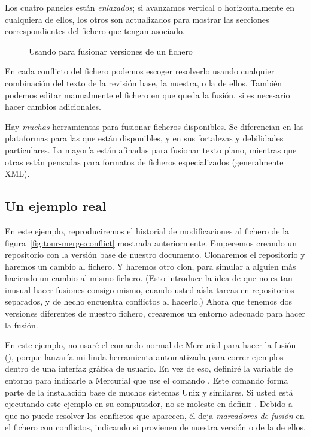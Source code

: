 Los cuatro paneles están \emph{enlazados}; si avanzamos vertical o
horizontalmente en cualquiera de ellos, los otros son actualizados
para mostrar las secciones correspondientes del fichero que tengan
asociado.

\begin{figure}[ht]
  \centering
  \caption{Usando  para fusionar versiones de un
  fichero}
  \label{fig:tour-merge:kdiff3}
\end{figure}

En cada conflicto del fichero podemos escoger resolverlo usando
cualquier combinación del texto de la revisión base, la nuestra, o la
de ellos. También podemos editar manualmente el fichero en que queda
la fusión, si es necesario hacer cambios adicionales.

Hay \emph{muchas} herramientas para fusionar ficheros disponibles. Se
diferencian en las plataformas para las que están disponibles, y en
sus fortalezas y debilidades particulares. La mayoría están afinadas
para fusionar texto plano, mientras que otras están pensadas para
formatos de ficheros especializados (generalmente XML).

\subsection{Un ejemplo real}

En este ejemplo, reproduciremos el historial de modificaciones al
fichero de la figura~\ref{fig:tour-merge:conflict} mostrada
anteriormente.  Empecemos creando un repositorio con la versión base
de nuestro documento.
Clonaremos el repositorio y haremos un cambio al fichero.
Y haremos otro clon, para simular a alguien más haciendo un cambio al
mismo fichero. (Esto introduce la idea de que no es tan inusual hacer
fusiones consigo mismo, cuando usted aísla tareas en repositorios
separados, y de hecho encuentra conflictos al hacerlo.)
Ahora que tenemos dos versiones diferentes de nuestro fichero,
crearemos un entorno adecuado para hacer la fusión.

En este ejemplo, no usaré el comando normal de Mercurial para hacer la
fusión (), porque lanzaría mi linda herramienta
automatizada para correr ejemplos dentro de una interfaz gráfica de
usuario. En vez de eso, definiré la variable de entorno
 para indicarle a Mercurial que use el comando
. Este comando forma parte de la instalación base de
muchos sistemas Unix y similares. Si usted está ejecutando este
ejemplo en su computador, no se moleste en definir .
Debido a que  no puede resolver los conflictos que
aparecen, él deja \emph{marcadores de fusión} en el fichero con
conflictos, indicando si provienen de nuestra versión o de la de
ellos.

